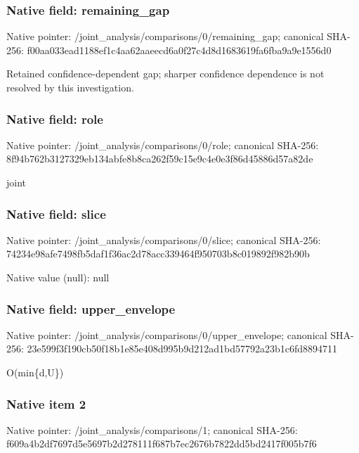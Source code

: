 \documentclass[10pt,a4paper]{article}
\begin{document}
\subsubsection{Native field: remaining\_\allowbreak{}gap}
Native pointer: /joint\_\allowbreak{}analysis/comparisons/0/remaining\_\allowbreak{}gap; canonical SHA-256: f00aa033ead1188ef1c4aa62aaeecd6a0f27c4d8d1683619fa6fba9a9e1556d0

\begingroup\raggedright\sloppy Retained confidence-dependent gap;\allowbreak{} sharper confidence dependence is not resolved by this investigation.\par\endgroup

\subsubsection{Native field: role}
Native pointer: /joint\_\allowbreak{}analysis/comparisons/0/role; canonical SHA-256: 8f94b762b3127329eb134abfe8b8ca262f59c15e9c4e0e3f86d45886d57a82de

\begingroup\raggedright\sloppy joint\par\endgroup

\subsubsection{Native field: slice}
Native pointer: /joint\_\allowbreak{}analysis/comparisons/0/slice; canonical SHA-256: 74234e98afe7498fb5daf1f36ac2d78acc339464f950703b8c019892f982b90b

Native value (null): null

\subsubsection{Native field: upper\_\allowbreak{}envelope}
Native pointer: /joint\_\allowbreak{}analysis/comparisons/0/upper\_\allowbreak{}envelope; canonical SHA-256: 23e599f3f190cb50f18b1e85e408d995b9d212ad1bd57792a23b1c6fd8894711

\begingroup\raggedright\sloppy O(min\{d,\allowbreak{}U\})\par\endgroup

\subsubsection{Native item 2}
Native pointer: /joint\_\allowbreak{}analysis/comparisons/1; canonical SHA-256: f609a4b2df7697d5e5697b2d278111f687b7ec2676b7822dd5bd2417f005b7f6
\end{document}

